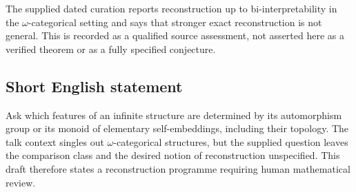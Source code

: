 \documentclass[11pt]{article}
\begin{document}
The supplied dated curation reports reconstruction up to bi-interpretability in the \(\omega\)-categorical setting and says that stronger exact reconstruction is not general. This is recorded as a qualified source assessment, not asserted here as a verified theorem or as a fully specified conjecture.
\subsection{Short English statement}
Ask which features of an infinite structure are determined by its automorphism group or its monoid of elementary self-embeddings, including their topology. The talk context singles out \(\omega\)-categorical structures, but the supplied question leaves the comparison class and the desired notion of reconstruction unspecified. This draft therefore states a reconstruction programme requiring human mathematical review.
\end{document}
